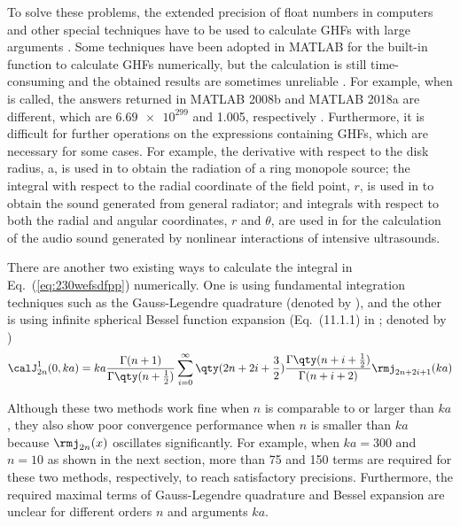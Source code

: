 To solve these problems, the extended precision of float numbers in computers and other special techniques have to be used to calculate GHFs with large arguments \cite{Perger1993NumericalEvaluatorGeneralized, Pearson2009ComputationHypergeometricFunctions}. 
Some techniques have been adopted in MATLAB for the built-in function  to calculate GHFs numerically, but the calculation is still time-consuming and the obtained results are sometimes unreliable \cite{Pearson2009ComputationHypergeometricFunctions}. 
For example, when  is called, the answers returned in MATLAB 2008b and MATLAB 2018a are different, which are $\num{6.69 e299}$ and 1.005, respectively \cite{Pearson2009ComputationHypergeometricFunctions}. 
Furthermore, it is difficult for further operations on the expressions containing GHFs, which are necessary for some cases. For example, the derivative with respect to the disk radius, a, is used in \cite{Carley2010SeriesExpansionSound} to obtain the radiation of a ring monopole source; 
the integral with respect to the radial coordinate of the field point, $r$, is used in \cite{Carley2006SeriesExpansionSound} to obtain the sound generated from general radiator; 
and integrals with respect to both the radial and angular coordinates, $r$ and $\theta$, are used in \cite{Cervenka2013NonparaxialModelParametric} for the calculation of the audio sound generated by nonlinear interactions of intensive ultrasounds. 

There are another two existing ways to calculate the integral in Eq.~(\ref{eq:230wefsdfpp}) numerically. 
One is using fundamental integration techniques such as the Gauss-Legendre quadrature (denoted by ), and the other is using infinite spherical Bessel function expansion (Eq.~(11.1.1) in \cite{Abramowitz1972HandbookMathematicalFunctions}; denoted by )
\begin{equation}
    \calJ_{2n}^1 (0,ka)
    =
    ka \frac{\Gamma(n+1)}{\Gamma\qty(n+\frac{1}{2})}
    \sum_{i=0}^\infty 
    \qty(2n+2i+\frac{3}{2})
    \frac{\Gamma\qty(n+i+\frac{1}{2})}{\Gamma(n+i+2)}
    \rmj_{2n+2i+1}(ka)
    \label{eq:cwe_bess}
\end{equation}

Although these two methods work fine when $n$ is comparable to or larger than $ka$, 
they also show poor convergence performance when $n$ is smaller than $ka$ because $\rmj_{2n}(x)$ oscillates significantly. 
For example, when $ka = 300$ and $n = 10$ as shown in the next section, more than 75 and 150 terms are required for these two methods, respectively, to reach satisfactory precisions. 
Furthermore, the required maximal terms of Gauss-Legendre quadrature and Bessel expansion are unclear for different orders $n$ and arguments $ka$.

